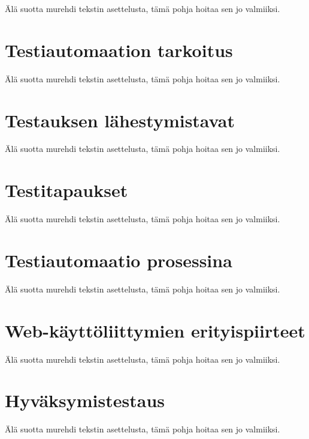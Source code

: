 Älä suotta murehdi tekstin asettelusta, tämä pohja hoitaa sen jo valmiiksi.

\section{Testiautomaation tarkoitus}

Älä suotta murehdi tekstin asettelusta, tämä pohja hoitaa sen jo valmiiksi.

\section{Testauksen lähestymistavat}

Älä suotta murehdi tekstin asettelusta, tämä pohja hoitaa sen jo valmiiksi.

\section{Testitapaukset}

Älä suotta murehdi tekstin asettelusta, tämä pohja hoitaa sen jo valmiiksi.

\section{Testiautomaatio prosessina}

Älä suotta murehdi tekstin asettelusta, tämä pohja hoitaa sen jo valmiiksi.

\section{Web-käyttöliittymien erityispiirteet}

Älä suotta murehdi tekstin asettelusta, tämä pohja hoitaa sen jo valmiiksi.

\section{Hyväksymistestaus}

Älä suotta murehdi tekstin asettelusta, tämä pohja hoitaa sen jo valmiiksi.
